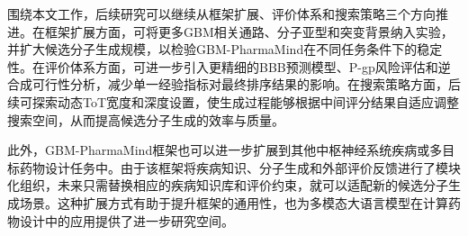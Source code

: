 围绕本文工作，后续研究可以继续从框架扩展、评价体系和搜索策略三个方向推进。在框架扩展方面，可将更多GBM相关通路、分子亚型和突变背景纳入实验，并扩大候选分子生成规模，以检验GBM-PharmaMind在不同任务条件下的稳定性。在评价体系方面，可进一步引入更精细的BBB预测模型、P-gp风险评估和逆合成可行性分析，减少单一经验指标对最终排序结果的影响。在搜索策略方面，后续可探索动态ToT宽度和深度设置，使生成过程能够根据中间评分结果自适应调整搜索空间，从而提高候选分子生成的效率与质量。

此外，GBM-PharmaMind框架也可以进一步扩展到其他中枢神经系统疾病或多目标药物设计任务中。由于该框架将疾病知识、分子生成和外部评价反馈进行了模块化组织，未来只需替换相应的疾病知识库和评价约束，就可以适配新的候选分子生成场景。这种扩展方式有助于提升框架的通用性，也为多模态大语言模型在计算药物设计中的应用提供了进一步研究空间。
